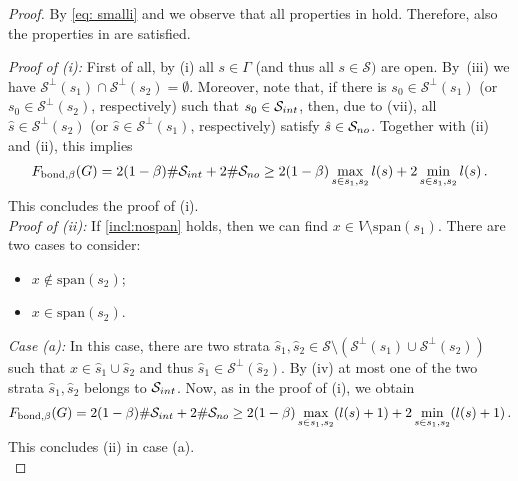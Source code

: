 \documentclass[10pt,a4paper]{amsart}
\begin{document}
\begin{proof} 
By  \eqref{eq: smalli} and  we observe that all properties in  hold. Therefore, also the properties in  are satisfied.  



\noindent\emph{Proof of {\rm (i)}:} First of all, by (i) all $s\in \Gamma$ (and thus all $s \in \mathcal{S})$ are open.  By~(iii) we have $\mathcal{S}^\perp(s_1) \cap \mathcal{S}^\perp(s_2)=\emptyset$.  Moreover, note that, if there is $s_0 \in  \mathcal{S}^\perp(s_1) $ (or $s_0 \in  \mathcal{S}^\perp(s_2) $, respectively)  such that $s_0 \in \mathcal{S}_{\rm int}$, then,  due to (vii), all $\hat{s} \in \mathcal{S}^\perp(s_2)$ (or $\hat{s} \in \mathcal{S}^\perp(s_1)$, respectively)   satisfy $\hat{s} \in \mathcal{S}_{\rm no}$.   Together with  (ii) and   (ii), this implies
\begin{align*}
 F_{\mathrm{bond},\beta} (G)  =  2(1-\beta) \#\mathcal{S}_{\rm int} + 2\#\mathcal{S}_{\rm no} \geq 2(1-\beta)\max_{s \in s_1,s_2} l(s) + 2\min_{s \in s_1,s_2} l(s) \,.
\end{align*}
This concludes the proof of (i). \\ 
\noindent\emph{Proof of {\rm (ii)}:} If \eqref{incl:nospan} holds, then we can find $x \in V \setminus \mathrm{span}(s_1)$. There are two cases to consider:
\begin{itemize}
\item[(a)] $x \notin \mathrm{span}(s_2)$;
\item[(b)] $x \in \mathrm{span}(s_2)$.
\end{itemize}
\noindent \emph{Case {\rm (a)}:} In this case, there are two strata $\hat{s}_1,\hat{s}_2 \in \mathcal{S} \setminus\left( \mathcal{S}^\perp(s_1) \cup \mathcal{S}^\perp(s_2)\right)$ such that $x \in  \hat{s}_1\cup\hat{s}_2$ and thus $\hat{s}_1 \in \mathcal{S}^\perp(\hat{s}_2)$. By (iv) at most one of the two strata $\hat{s}_1, \hat{s}_2$ belongs to $\mathcal{S}_{\rm int}$. Now, as in the proof of (i), we obtain 
\begin{align*}
 F_{\mathrm{bond},\beta}  (G)  =  2(1-\beta) \#\mathcal{S}_{\rm int} + 2\#\mathcal{S}_{\rm no} \geq  2(1-\beta) \max_{s \in s_1,s_2} (l(s)+1) + 2\min_{s \in s_1,s_2} (l(s)+1) \,.
\end{align*}
This concludes (ii) in case (a). \\ 

\end{proof}
\end{document}
